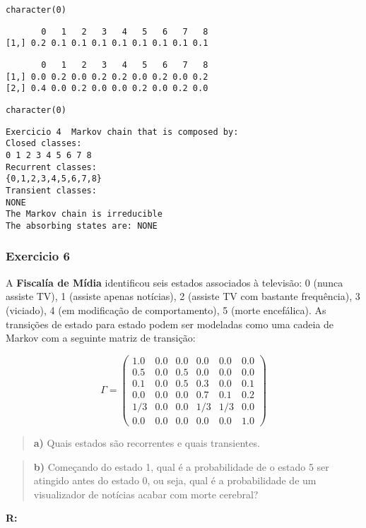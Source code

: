 \documentclass[
]{article}
\begin{document}
\begin{verbatim}
character(0)
\end{verbatim}

\begin{verbatim}
       0   1   2   3   4   5   6   7   8
[1,] 0.2 0.1 0.1 0.1 0.1 0.1 0.1 0.1 0.1
\end{verbatim}

\begin{verbatim}
       0   1   2   3   4   5   6   7   8
[1,] 0.0 0.2 0.0 0.2 0.2 0.0 0.2 0.0 0.2
[2,] 0.4 0.0 0.2 0.0 0.0 0.2 0.0 0.2 0.0
\end{verbatim}

\begin{verbatim}
character(0)
\end{verbatim}

\begin{verbatim}
Exercicio 4  Markov chain that is composed by: 
Closed classes: 
0 1 2 3 4 5 6 7 8 
Recurrent classes: 
{0,1,2,3,4,5,6,7,8}
Transient classes: 
NONE 
The Markov chain is irreducible 
The absorbing states are: NONE
\end{verbatim}

\hypertarget{exercicio-6}{%
\subsubsection{Exercicio 6}\label{exercicio-6}}

A \textbf{Fiscalía de Mídia} identificou seis estados associados à
televisão: 0 (nunca assiste TV), 1 (assiste apenas notícias), 2 (assiste
TV com bastante frequência), 3 (viciado), 4 (em modificação de
comportamento), 5 (morte encefálica). As transições de estado para
estado podem ser modeladas como uma cadeia de Markov com a seguinte
matriz de transição:

\[\Gamma = \begin{pmatrix}
1.0 & 0.0 & 0.0 & 0.0 & 0.0 & 0.0 \\
0.5 & 0.0 & 0.5 & 0.0 & 0.0 & 0.0 \\
0.1 & 0.0 & 0.5 & 0.3 & 0.0 & 0.1 \\
0.0 & 0.0 & 0.0 & 0.7 & 0.1 & 0.2 \\
1/3 & 0.0 & 0.0 & 1/3 & 1/3 & 0.0 \\
0.0 & 0.0 & 0.0 & 0.0 & 0.0 & 1.0
\end{pmatrix}\]

\begin{quote}
\textbf{a)} Quais estados são recorrentes e quais transientes.
\end{quote}

\begin{quote}
\textbf{b)} Começando do estado 1, qual é a probabilidade de o estado 5
ser atingido antes do estado 0, ou seja, qual é a probabilidade de um
visualizador de notícias acabar com morte cerebral?
\end{quote}

\textbf{R:}
\end{document}
